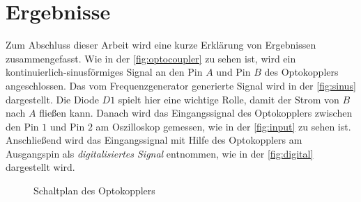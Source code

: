 \chapter{Ergebnisse}

Zum Abschluss dieser Arbeit wird eine kurze Erklärung von Ergebnissen zusammengefasst. Wie in der \autoref{fig:optocoupler} zu sehen ist, wird ein kontinuierlich-sinusförmiges Signal an den Pin $A$ und Pin $B$ des Optokopplers angeschlossen. Das vom Frequenzgenerator generierte Signal wird in der \autoref{fig:sinus} dargestellt. Die Diode $D1$ spielt hier eine wichtige Rolle, damit der Strom von $B$ nach $A$ fließen kann. Danach wird das Eingangssignal des Optokopplers zwischen den Pin $1$ und Pin $2$ am Oszilloskop gemessen, wie in der \autoref{fig:input} zu sehen ist. Anschließend wird das Eingangssignal mit Hilfe des Optokopplers am Ausgangspin als \textit{digitalisiertes Signal} entnommen, wie in der \autoref{fig:digital} dargestellt wird. \smallskip \smallskip

\begin{figure}[htbp]
	\centering
	\caption{Schaltplan des Optokopplers}\label{fig:optocoupler}
\end{figure} 


